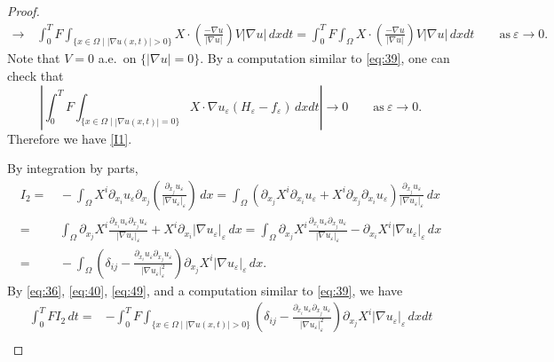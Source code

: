 \documentclass{amsart}
\theoremstyle{definition}
\begin{document}
\begin{proof}
\begin{equation*}
\begin{split}
\to & \,  
\int_0 ^T F \int _{\{ x \in \Omega \mid |\nabla u (x,t)|>0 \}} X \cdot \left( \frac{-\nabla u}{|\nabla u|} \right)
V |\nabla u| \, dx dt
=
\int_0 ^T F \int _{\Omega} X \cdot \left( \frac{-\nabla u}{|\nabla u|}\right)
V |\nabla u| \, dx dt \qquad \text{as} \ \varepsilon \to 0.
\end{split}
\end{equation*}
Note that $V=0$ a.e.\ on $\{ |\nabla u|=0 \}$.
By a computation similar to \eqref{eq:39}, one can check that
\[
\left|
\int_0 ^T F \int _{\{ x \in \Omega \mid |\nabla u (x,t)|=0 \}} X \cdot \nabla u_\varepsilon (H_\varepsilon - f_\varepsilon )  \, dx dt
\right| \to 0 \qquad \text{as} \ \varepsilon \to 0.
\]
Therefore we have \eqref{I1}.

By integration by parts, 
\begin{equation}\label{eq:49}
\begin{split}
I_2 =& \, -\int_{\Omega} X^i \partial_{x_i} u_\varepsilon
\partial_{x_j} \left( \frac{\partial_{x_j} u_\varepsilon }{|\nabla u_\varepsilon|_\varepsilon} \right)   \, dx 
= 
\int_{\Omega} (\partial_{x_j} X^i \partial_{x_i} u_\varepsilon + 
X^i \partial_{x_j} \partial_{x_i} u_\varepsilon)
 \frac{\partial_{x_j} u_\varepsilon }{|\nabla u_\varepsilon|_\varepsilon}  \, dx \\
=& \,
\int_{\Omega} 
\partial_{x_j} X^i 
\frac{\partial_{x_i} u_\varepsilon \partial_{x_j} u_\varepsilon }{|\nabla u_\varepsilon|_\varepsilon}
+ 
X^i \partial_{x_i} |\nabla u_\varepsilon|_\varepsilon  \, dx 
=
\int_{\Omega} 
\partial_{x_j} X^i 
\frac{\partial_{x_i} u_\varepsilon \partial_{x_j} u_\varepsilon }{|\nabla u_\varepsilon|_\varepsilon} 
-
\partial_{x_i} X^i  |\nabla u_\varepsilon|_\varepsilon  \, dx \\
=& \, 
-\int_{\Omega} \left( \delta_{ij} -  \frac{\partial_{x_i} u_\varepsilon \partial_{x_j} u_\varepsilon }{|\nabla u_\varepsilon|_\varepsilon ^2} \right) \partial _{x_j} X^i |\nabla u_\varepsilon|_\varepsilon \, dx.
\end{split}
\end{equation}
By \eqref{eq:36}, \eqref{eq:40}, \eqref{eq:49}, and a computation similar to \eqref{eq:39},
we have
\begin{equation}
\begin{split}
\int _0 ^T F I_2 \, dt
=& 
-\int_0 ^T F \int_{\{ x \in \Omega \mid |\nabla u (x,t)|>0 \}} \left( \delta_{ij} -  \frac{\partial_{x_i} u_\varepsilon \partial_{x_j} u_\varepsilon }{|\nabla u_\varepsilon|_\varepsilon ^2} \right) \partial _{x_j} X^i |\nabla u_\varepsilon|_\varepsilon \, dx dt\\

\end{split}
\end{equation}
\end{proof}
\end{document}

